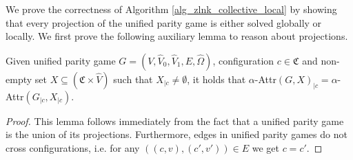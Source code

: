 We prove the correctness of Algorithm \ref{alg_zlnk_collective_local} by showing that every projection of the unified parity game is either solved globally or locally. We first prove the following auxiliary lemma to reason about projections.

\begin{lemma}
	\label{lem_projected_attr_is_attr_of_projected}
	Given unified parity game $G = (V,\hat{V}_0,\hat{V}_1,E,\hat{\Omega})$, configuration $c \in \mathfrak{C}$ and non-empty set $X \subseteq (\mathfrak{C} \times \hat{V})$ such that $X_{|c} \neq \emptyset$, it holds that $\alpha$-Attr$(G,X)_{|c}= \alpha$-Attr$(G_{|c},X_{|c})$.
	\begin{proof}
		This lemma follows immediately from the fact that a unified parity game is the union of its projections. Furthermore, edges in unified parity games do not cross configurations, i.e. for any $((c,v),(c',v')) \in E$ we get $c = c'$.
	\end{proof}
\end{lemma}

